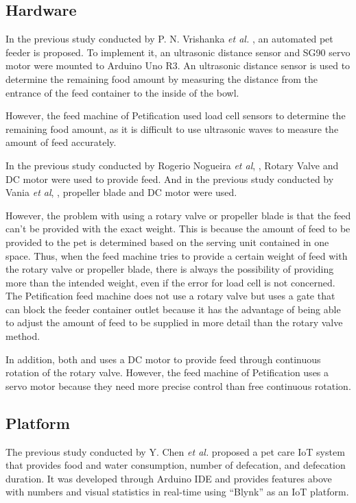 \documentclass[conference]{IEEEtran}
\begin{document}
\subsection{Hardware}
In the previous study conducted by P. N. Vrishanka \textit{et al.} \cite{b11}, an automated pet feeder is proposed. To implement it, an ultrasonic distance sensor and SG90 servo motor were mounted to Arduino Uno R3. An ultrasonic distance sensor is used to determine the remaining food amount by measuring the distance from the entrance of the feed container to the inside of the bowl.

However, the feed machine of Petification used load cell sensors to determine the remaining food amount, as it is difficult to use ultrasonic waves to measure the amount of feed accurately.

In the previous study conducted by Rogerio Nogueira \textit{et al}, \cite{b12} , Rotary Valve and DC motor were used to provide feed. And in the previous study conducted by Vania \textit{et al}, \cite{b13}, propeller blade and DC motor were used.

However, the problem with using a rotary valve or propeller blade is that the feed can’t be provided with the exact weight. This is because the amount of feed to be provided to the pet is determined based on the serving unit contained in one space. Thus, when the feed machine tries to provide a certain weight of feed with the rotary valve or propeller blade, there is always the possibility of providing more than the intended weight, even if the error for load cell is not concerned. The Petification feed machine does not use a rotary valve but uses a gate that can block the feeder container outlet because it has the advantage of being able to adjust the amount of feed to be supplied in more detail than the rotary valve method.

In addition, both \cite{b12} and \cite{b13} uses a DC motor to provide feed through continuous rotation of the rotary valve. However, the feed machine of Petification uses a servo motor because they need more precise control than free continuous rotation.\cite{b14} 

\subsection{Platform}
  The previous study conducted by Y. Chen \textit{et al.} \cite{b5}
proposed a pet care IoT system that provides food and water consumption, number of defecation, and defecation duration. It was developed through Arduino IDE and provides features above with numbers and visual statistics in real-time using “Blynk” as an IoT platform.
\end{document}
